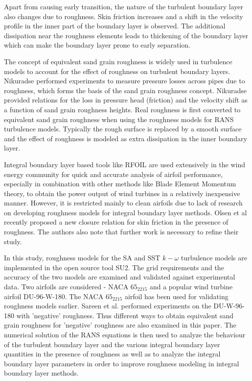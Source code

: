 Apart from causing early transition, the nature of the turbulent boundary layer also changes due to roughness. Skin friction increases and a shift in the velocity profile in the inner part of the boundary layer is observed. The additional dissipation near the roughness elements leads to thickening of the boundary layer which can make the boundary layer prone to early separation. %

The concept of equivalent sand grain roughness is widely used in turbulence models to account for the effect of roughness on turbulent boundary layers. Nikuradse\citep{nikuradse1950laws} performed experiments to measure pressure losses across pipes due to roughness, which forms the basis of the sand grain roughness concept. Nikuradse provided relations for the loss in pressure head (friction) and the velocity shift as a function of sand grain roughness heights. Real roughness is first converted to equivalent sand grain roughness when using the roughness models for RANS turbulence models.
Typically the rough surface is replaced by a smooth surface and the effect of roughness is modeled as extra dissipation in the inner boundary layer.%

Integral boundary layer based tools like RFOIL\cite{rfoil_orig} are used extensively in the wind energy community for quick and accurate analysis of airfoil performance, especially in combination with other methods like Blade Element Momentum theory, to obtain the power output of wind turbines in a relatively inexpensive manner. However, it is restricted mainly to clean airfoils due to lack of research on developing roughness models for integral boundary layer methods. Olsen et al\cite{olsen2020improved} recently proposed a new closure relation for skin friction in the presence of roughness. The authors also note that further work is necessary to refine their study. 

In this study, roughness models for the SA and SST $k-\omega$ turbulence models are implemented in the open source tool SU2\cite{SU22014}. The grid requirements and the accuracy of the two models are examined and validated against experimental data. Two airfoils are considered - NACA $65_2215$ and a popular wind turbine airfoil DU-96-W-180. The NACA $65_2215$ airfoil has been used for validating roughness models earlier\cite{hellsten1997extension}\cite{knopp2009new}. Sareen et al. \cite{sareen2014effects} performed experiments on the DU-W-96-180 with 'negative' roughness. Thus different ways to obtain equivalent sand grain roughness for 'negative' roughness are also examined in this paper. The numerical solution of the RANS equations is then used to analyze the behaviour of the turbulent boundary layer and the various integral boundary layer quantities in the presence of roughness as well as to analyze the integral boundary layer parameters in order to improve roughness modeling in integral boundary layer methods.

